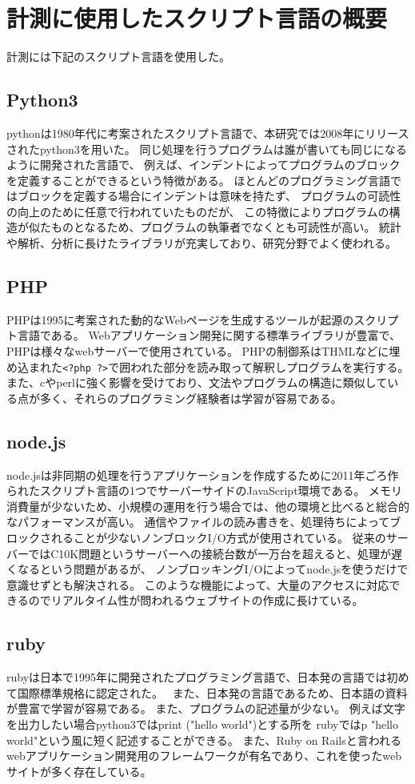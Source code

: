 \chapter{計測に使用したスクリプト言語の概要}
\label{cha:script-language}
計測には下記のスクリプト言語を使用した。
\section{Python3}
pythonは1980年代に考案されたスクリプト言語で、本研究では2008年にリリースされたpython3を用いた。
同じ処理を行うプログラムは誰が書いても同じになるように開発された言語で、
例えば、インデントによってプログラムのブロックを定義することができるという特徴がある。
ほとんどのプログラミング言語ではブロックを定義する場合にインデントは意味を持たず、
プログラムの可読性の向上のために任意で行われていたものだが、
この特徴によりプログラムの構造が似たものとなるため、プログラムの執筆者でなくとも可読性が高い。
統計や解析、分析に長けたライブラリが充実しており、研究分野でよく使われる。

\section{PHP}
PHPは1995に考案された動的なWebページを生成するツールが起源のスクリプト言語である。
Webアプリケーション開発に関する標準ライブラリが豊富で、PHPは様々なwebサーバーで使用されている。
PHPの制御系はTHMLなどに埋め込まれた\verb|<?php ?>|で囲われた部分を読み取って解釈しプログラムを実行する。
また、cやperlに強く影響を受けており、文法やプログラムの構造に類似している点が多く、それらのプログラミング経験者は学習が容易である。

\section{node.js}
node.jsは非同期の処理を行うアプリケーションを作成するために2011年ごろ作られたスクリプト言語の1つでサーバーサイドのJavaScript環境である。
メモリ消費量が少ないため、小規模の運用を行う場合では、他の環境と比べると総合的なパフォーマンスが高い。
通信やファイルの読み書きを、処理待ちによってブロックされることが少ないノンブロックI/O方式が使用されている。
従来のサーバーではC10K問題というサーバーへの接続台数が一万台を超えると、処理が遅くなるという問題があるが、
ノンブロッキングI/Oによってnode.jsを使うだけで意識せずとも解決される。
このような機能によって、大量のアクセスに対応できるのでリアルタイム性が問われるウェブサイトの作成に長けている。

\section{ruby}
rubyは日本で1995年に開発されたプログラミング言語で、日本発の言語では初めて国際標準規格に認定された。　
また、日本発の言語であるため、日本語の資料が豊富で学習が容易である。
また、プログラムの記述量が少ない。
例えば文字を出力したい場合python3ではprint ("hello world")とする所を
rubyではp "hello world"という風に短く記述することができる。
また、Ruby on Railsと言われるwebアプリケーション開発用のフレームワークが有名であり、これを使ったwebサイトが多く存在している。